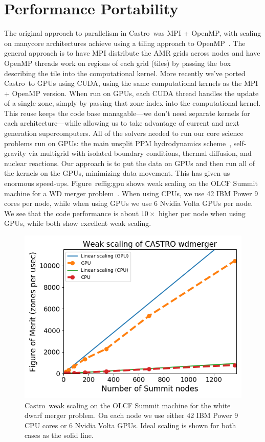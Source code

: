 \documentclass[a4paper]{jpconf}
\newcommand{\castro}{{\sffamily Castro}}
\begin{document}
\section{Performance Portability}

The original approach to parallelism in \castro\ was MPI + OpenMP,
with scaling on manycore architectures achieve using a tiling approach
to OpenMP~\cite{tiling,astronum:2017}.  The general approach is to
have MPI distribute the AMR grids across nodes and have OpenMP threads
work on regions of each grid (tiles) by passing the box describing the
tile into the computational kernel.  More recently we've ported
\castro\ to GPUs using CUDA, using the same computational kernels as
the MPI + OpenMP version.  When run on GPUs, each CUDA thread handles
the update of a single zone, simply by passing that zone index into
the computational kernel.  This reuse keeps the code base
managable---we don't need separate kernels for each
architecture---while allowing us to take advantage of current and next
generation supercomputers.  All of the solvers needed to run our core
science problems run on GPUs: the main unsplit PPM hydrodynamics
scheme~\cite{ppm,millercolella:2002}, self-gravity via multigrid with
isolated boundary conditions, thermal diffusion, and nuclear
reactions.  Our approach is to put the data on GPUs and then run all
of the kernels on the GPUs, minimizing data movement.  This has given
us enormous speed-ups.  Figure~ref{fig:gpu} shows weak scaling on the
OLCF Summit machine for a WD merger problem~\cite{wdmergerI}.  When
using CPUs, we use 42 IBM Power 9 cores per node, while when using
GPUs we use 6 Nvidia Volta GPUs per node.  We see that the code
performance is about $10\times$ higher per node when using GPUs, while
both show excellent weak scaling.

\begin{figure}[t]
\centering
\includegraphics[width=0.8\linewidth]{wdmerger_gpu}
\caption{\label{fig:gpu} \castro\ weak scaling on the OLCF Summit
  machine for the white dwarf merger problem.  On each node we use
  either 42 IBM Power 9 CPU cores or 6 Nvidia Volta GPUs.  Ideal
  scaling is shown for both cases as the solid line.}
\end{figure}
\end{document}
